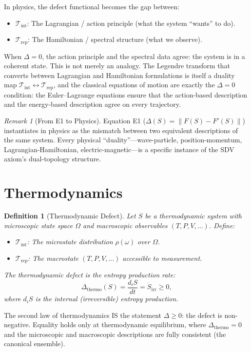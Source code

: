 \documentclass[12pt, openany]{book}
\newtheorem{definition}[theorem]{Definition}
\theoremstyle{remark}
\newtheorem{remark}[theorem]{Remark}
\newcommand{\Tint}{\mathcal{T}_{\mathrm{int}}}
\newcommand{\Trep}{\mathcal{T}_{\mathrm{rep}}}
\begin{document}
In physics, the defect functional becomes the gap between:
\begin{itemize}
  \item $\Tint$: The Lagrangian / action principle (what the system ``wants'' to do).
  \item $\Trep$: The Hamiltonian / spectral structure (what we observe).
\end{itemize}
When $\Delta = 0$, the action principle and the spectral data agree: the system is in
a coherent state.  This is not merely an analogy.  The
Legendre transform that converts between Lagrangian and Hamiltonian formulations is
itself a duality map $\Tint \leftrightarrow \Trep$, and the classical equations of
motion are exactly the $\Delta = 0$ condition: the Euler--Lagrange equations ensure
that the action-based description and the energy-based description agree on every
trajectory.

\begin{remark}[From E1 to Physics]
Equation E1 ($\Delta(S) = \|F(S) - F'(S)\|$) instantiates in physics as the mismatch
between two equivalent descriptions of the same system.  Every physical ``duality''---wave-particle,
position-momentum, Lagrangian-Hamiltonian, electric-magnetic---is a specific instance of
the SDV axiom's dual-topology structure.
\end{remark}


\section{Thermodynamics}
\label{sec:thermo}

\begin{definition}[Thermodynamic Defect]
\label{def:thermo-defect}
Let $S$ be a thermodynamic system with microscopic state space $\Omega$ and macroscopic
observables $(T, P, V, \ldots)$.  Define:
\begin{itemize}
  \item $\Tint$: The microstate distribution $\rho(\omega)$ over $\Omega$.
  \item $\Trep$: The macrostate $(T, P, V, \ldots)$ accessible to measurement.
\end{itemize}
The thermodynamic defect is the entropy production rate:
\[
  \Delta_{\mathrm{thermo}}(S) = \frac{d_i S}{dt} = \dot{S}_{\mathrm{irr}} \geq 0,
\]
where $d_i S$ is the internal (irreversible) entropy production.
\end{definition}

The second law of thermodynamics IS the statement $\Delta \geq 0$: the defect is
non-negative.  Equality holds only at thermodynamic equilibrium, where
$\Delta_{\mathrm{thermo}} = 0$ and the microscopic and macroscopic descriptions
are fully consistent (the canonical ensemble).
\end{document}
